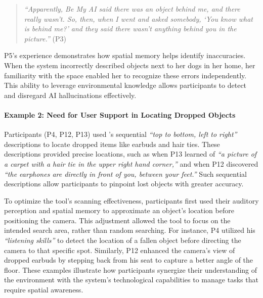 \begin{quote}
    \textit{``Apparently, Be My AI said there was an object behind me, and there really wasn't. So, then, when I went and asked somebody, `You know what is behind me?' and they said there wasn't anything behind you in the picture.''} (P3)
\end{quote}


P5's experience demonstrates how spatial memory helps identify inaccuracies. When the system incorrectly described objects next to her dogs in her home, her familiarity with the space enabled her to recognize these errors independently. This ability to leverage environmental knowledge allows participants to detect and disregard AI hallucinations effectively. 




\paragraph{Example 2: Need for User Support in Locating Dropped Objects}

Participants (P4, P12, P13) used \sbma's sequential \textit{``top to bottom, left to right''} descriptions to locate dropped items like earbuds and hair ties. 
% 
These descriptions provided precise locations, such as when P13 learned of \textit{``a picture of a carpet with a hair tie in the upper right hand corner,''} and when P12 discovered \textit{``the earphones are directly in front of you, between your feet.''}
Such sequential descriptions allow participants to pinpoint lost objects with greater accuracy. 



To optimize the tool's scanning effectiveness, participants first used their auditory perception and spatial memory to approximate an object's location before positioning the camera. 
This adjustment allowed the tool to focus on the intended search area, rather than random searching. 
% 
For instance, P4 utilized his \textit{``listening skills''} to detect the location of a fallen object before directing the camera to that specific spot. Similarly, P12 enhanced the camera's view of dropped earbuds by stepping back from his seat to capture a better angle of the floor. 
% 
These examples illustrate how participants synergize their understanding of the environment with the system's technological capabilities to manage tasks that require spatial awareness.








